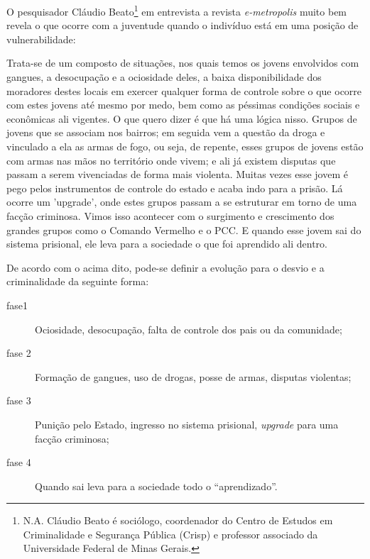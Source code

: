 \documentclass[
	12pt,				%
	openright,			%
	twoside,			%
	a4paper,			%
	chapter=TITLE,		%
	section=TITLE,		%
	subsection=TITLE,	%
	subsubsection=TITLE,%
	spanish,            %
	english,			%
	brazil				%
	]{abntex2}
\begin{document}
\FloatBarrier
\par
O pesquisador Cláudio Beato\footnote{N.A. Cláudio Beato é sociólogo, coordenador do Centro de Estudos em Criminalidade e Segurança Pública (Crisp) e professor	associado da Universidade Federal de Minas Gerais.} em entrevista a revista \textit{e-metropolis} muito bem revela o que ocorre com a juventude quando o indivíduo está em uma posição de vulnerabilidade:
\begin{citacao}
	Trata-se de um composto de situações, nos quais temos os jovens envolvidos com gangues, a desocupação e a ociosidade
	deles, a baixa disponibilidade dos moradores destes locais em exercer qualquer forma de controle sobre
	o que ocorre com estes jovens até mesmo por medo, bem como as péssimas condições sociais e econômicas ali vigentes.
	O que quero dizer é que há uma lógica nisso. Grupos de jovens que se associam nos bairros; em seguida
	vem a questão da droga e vinculado a ela as armas de fogo, ou seja, de repente, esses grupos de jovens
	estão com armas nas mãos no território onde vivem; e ali já existem disputas que passam a serem vivenciadas de forma mais violenta. Muitas vezes esse jovem é pego pelos instrumentos de controle do estado e acaba indo para a prisão. Lá ocorre um 'upgrade',
	onde estes grupos passam a se estruturar em torno de uma facção criminosa. Vimos isso acontecer com o
	surgimento e crescimento dos grandes grupos como o Comando Vermelho e o PCC. E quando esse jovem sai do sistema prisional, ele leva
	para a sociedade o que foi aprendido ali dentro.\cite[p. ~60]{Beato}
\end{citacao}
\par
De acordo com o acima dito, pode-se definir a evolução para o desvio e a criminalidade da seguinte forma: 
\begin{description}
	\item[fase1] Ociosidade, desocupação, falta de controle dos pais ou da comunidade;
	\item[fase 2] Formação de gangues, uso de drogas, posse de armas, disputas violentas;
	\item[fase 3] Punição pelo Estado, ingresso no sistema prisional, \textit{upgrade} para uma facção criminosa;
	\item[fase 4] Quando sai leva para a sociedade todo o “aprendizado”. 
\end{description}
\end{document}
